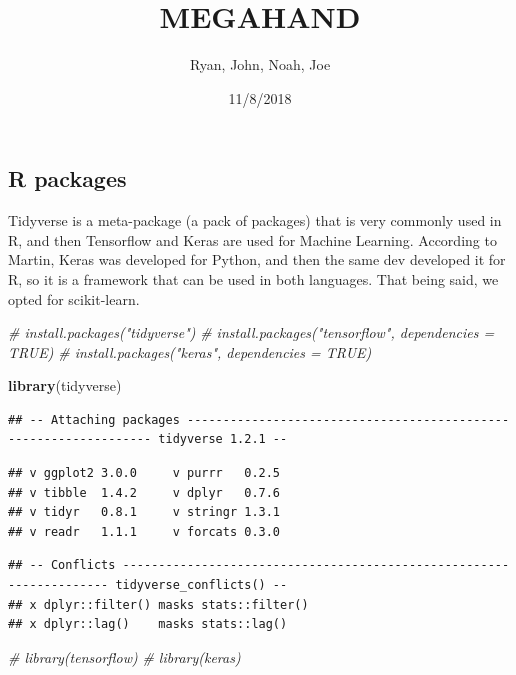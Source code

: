 \documentclass[]{article}
\title{MEGAHAND}
\author{Ryan, John, Noah, Joe}
\date{11/8/2018}
\newenvironment{Shaded}{\begin{snugshade}}{\end{snugshade}}
\newcommand{\KeywordTok}[1]{\textcolor[rgb]{0.13,0.29,0.53}{\textbf{#1}}}
\newcommand{\CommentTok}[1]{\textcolor[rgb]{0.56,0.35,0.01}{\textit{#1}}}
\newcommand{\NormalTok}[1]{#1}
\begin{document}
\maketitle

\subsection{R packages}\label{r-packages}

Tidyverse is a meta-package (a pack of packages) that is very commonly
used in R, and then Tensorflow and Keras are used for Machine Learning.
According to Martin, Keras was developed for Python, and then the same
dev developed it for R, so it is a framework that can be used in both
languages. That being said, we opted for scikit-learn.

\begin{Shaded}
\begin{Highlighting}[]
\CommentTok{# install.packages("tidyverse")}
\CommentTok{# install.packages("tensorflow", dependencies = TRUE)}
\CommentTok{# install.packages("keras", dependencies = TRUE)}

\KeywordTok{library}\NormalTok{(tidyverse)}
\end{Highlighting}
\end{Shaded}

\begin{verbatim}
## -- Attaching packages ----------------------------------------------------------------- tidyverse 1.2.1 --
\end{verbatim}

\begin{verbatim}
## v ggplot2 3.0.0     v purrr   0.2.5
## v tibble  1.4.2     v dplyr   0.7.6
## v tidyr   0.8.1     v stringr 1.3.1
## v readr   1.1.1     v forcats 0.3.0
\end{verbatim}

\begin{verbatim}
## -- Conflicts -------------------------------------------------------------------- tidyverse_conflicts() --
## x dplyr::filter() masks stats::filter()
## x dplyr::lag()    masks stats::lag()
\end{verbatim}

\begin{Shaded}
\begin{Highlighting}[]
\CommentTok{# library(tensorflow)}
\CommentTok{# library(keras)}
\end{Highlighting}
\end{Shaded}
\end{document}
